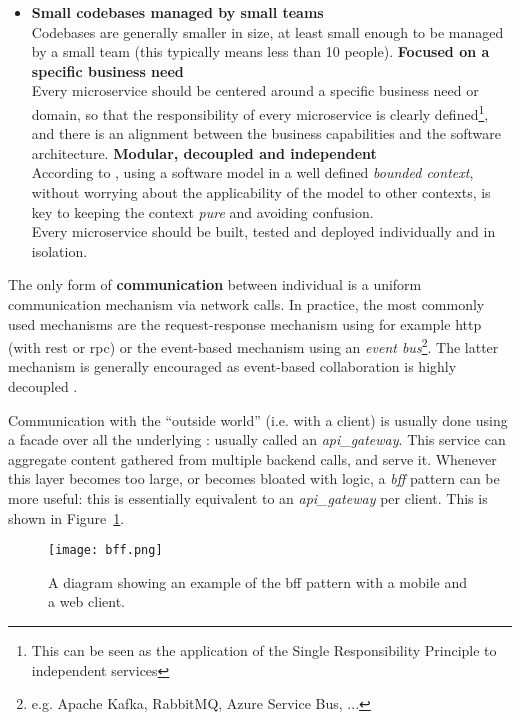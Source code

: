\begin{itemize}
    \item \textbf{Small codebases managed by small teams}\\
    Codebases are generally smaller in size, at least small enough to be managed
    by a small team (this typically means less than 10 people).
    \spacedItem \textbf{Focused on a specific business need}\\
    Every \gls{microservice} should be centered around a specific business need
    or domain, so that the responsibility of every \gls{microservice} is clearly
    defined\footnote{This can be seen as the application of the Single
    Responsibility Principle to independent services}, and there is an alignment
    between the business capabilities and the software architecture. 
    \spacedItem \textbf{Modular, decoupled and independent}\\
    According to \textcite{Evans_2004}, using a software model in a well defined
    \textit{bounded context}, without worrying about the applicability of the
    model to other contexts, is key to keeping the context \textit{pure} and
    avoiding confusion.\\
    Every \gls{microservice} should be built, tested and deployed
    individually and in isolation. 
\end{itemize}

The only form of \textbf{communication} between individual
 is a uniform communication mechanism via network calls.
In practice, the most commonly used mechanisms are the request-response
mechanism using for example \gls{http} (with \gls{rest} or \gls{rpc}) or the
event-based mechanism using an \textit{event bus}\footnote{e.g. Apache
Kafka, RabbitMQ, Azure Service Bus, ...}. The latter mechanism is generally
encouraged as event-based collaboration is highly decoupled
\autocite{Newman_2015}.

Communication with the ``outside world'' (i.e. with a client) is usually done
using a facade over all the underlying : usually called
an \textit{\gls{api_gateway}}. This service can aggregate content gathered from
multiple \gls{backend} calls, and serve it. Whenever this layer becomes too large, or
becomes bloated with logic, a \textit{\gls{bff}} pattern can be more useful:
this is essentially equivalent to an \textit{\gls{api_gateway}} per client. This
is shown in Figure~\ref{fig:bff}.


\begin{figure}
    \centering
    \texttt{[image: bff.png]}
    \caption[Backend for frontend pattern]{A diagram showing an example of the
    \gls{bff} pattern with a mobile and a web client.}
    \label{fig:bff}
\end{figure}


